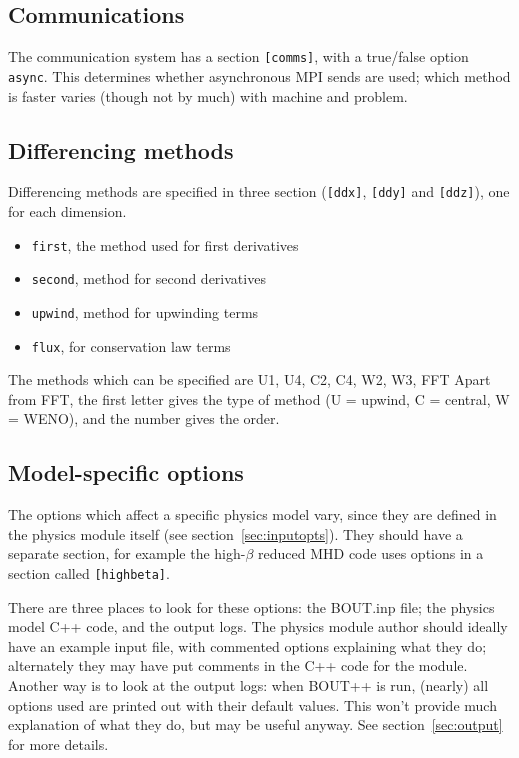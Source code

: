 \documentclass[12pt]{article}
\newcommand{\code}[1]{\texttt{#1}}
\begin{document}
\subsection{Communications}
%
%
The communication system has a section \code{[comms]}, with a true/false option
\code{async}. This determines whether asynchronous MPI sends are used; which
method is faster varies (though not by much) with machine and problem.



\subsection{Differencing methods}
%
\label{sec:diffmethodoptions}
%
%
Differencing methods are specified in three section (\code{[ddx]}, \code{[ddy]}
and \code{[ddz]}), one for each dimension.
%
\begin{itemize}
\item \code{first}, the method used for first derivatives
\item \code{second}, method for second derivatives
\item \code{upwind}, method for upwinding terms
\item \code{flux}, for conservation law terms
\end{itemize}
%
The methods which can be specified are U1, U4, C2, C4, W2, W3, FFT Apart from
FFT, the first letter gives the type of method (U = upwind, C = central, W =
WENO), and the number gives the order.



\subsection{Model-specific options}
%
The options which affect a specific physics model vary, since they are defined
in the physics module itself (see section~\ref{sec:inputopts}). They should
have a separate section, for example the high-$\beta$ reduced MHD code uses
options in a section called \code{[highbeta]}.

There are three places to look for these options: the BOUT.inp file; the
physics model C++ code, and the output logs. The physics module author should
ideally have an example input file, with commented options explaining what they
do; alternately they may have put comments in the C++ code for the module.
Another way is to look at the output logs: when BOUT++ is run, (nearly) all
options used are printed out with their default values. This won't provide much
explanation of what they do, but may be useful anyway.  See
section~\ref{sec:output} for more details.
\end{document}
